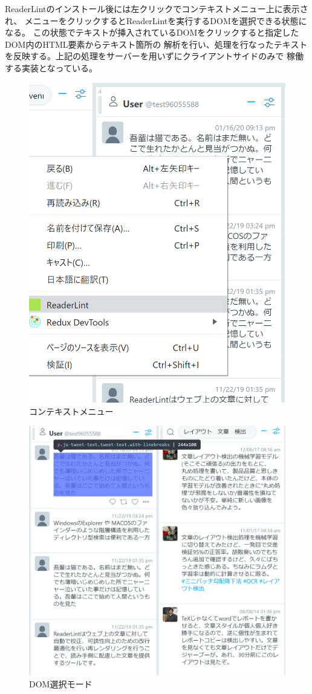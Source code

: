 ReaderLintのインストール後には左クリックでコンテキストメニュー上に表示され、
メニューをクリックするとReaderLintを実行するDOMを選択できる状態になる。
この状態でテキストが挿入されているDOMをクリックすると指定したDOM内のHTML要素からテキスト箇所の
解析を行い、処理を行なったテキストを反映する。上記の処理をサーバーを用いずにクライアントサイドのみで
稼働する実装となっている。

\begin{figure}[H]
    \centering
    \label{fig:image9}
    \includegraphics[width=0.6\columnwidth]{image/03/img0.png}
    \caption[コンテキストメニュー] {コンテキストメニュー}
\end{figure}
\begin{figure}[H]
    \centering
    \label{fig:image10}
    \includegraphics[width=0.6\columnwidth]{image/03/img1.png}
    \caption[DOM選択モード] {DOM選択モード}
\end{figure}


